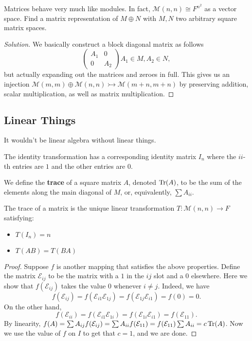 \begin{prb}
Matrices behave very much like modules. In fact, $\mathcal{M}(n, n)
\cong F^{n^2}$ as a vector space. Find a matrix representation of $M
\oplus N$ with $M, N$ two arbitrary square matrix spaces.
\end{prb}

\begin{proof}[Solution]
We basically construct a block diagonal matrix as follows
\[ \begin{pmatrix} A_1 & 0 \\ 0 & A_2 \end{pmatrix} A_1 \in M, A_2 \in
N, \]
but actually expanding out the matrices and zeroes in full. This gives
us an injection $\mathcal{M}(m, m) \oplus \mathcal{M}(n, n)
\rightarrowtail \mathcal{M}(m + n, m + n)$ by preserving addition,
scalar multiplication, as well as matrix multiplication.
\end{proof}

\subsection{Linear Things}
It wouldn't be linear algebra without linear things.
\begin{df}
The identity transformation has a corresponding identity matrix $I_n$
where the $ii$-th entries are $1$ and the other entries are $0$.
\end{df}

\begin{df}
We define the \textbf{trace} of a square matrix $A$, denoted $\operatorname{Tr}(A)$,
to be the sum of the elements along the main diagonal of $M$, or,
equivalently, $\sum A_{ii}$.
\end{df}

\begin{prop}
The trace of a matrix is the unique linear transformation $T :
\mathcal{M}(n, n) \rightarrow F$ satisfying:
\begin{itemize}
\item $T(I_n) = n$
\item $T(AB) = T(BA)$
\end{itemize}
\end{prop}

\begin{proof}
Suppose $f$ is another mapping that satisfies the above properties.
Define the matrix $\mathcal{E}_{ij}$ to be the matrix with a $1$ in the
$ij$ slot and a $0$ elsewhere. Here we show that $f(\mathcal{E}_{ij})$
takes the value $0$ whenever $i \neq j$. Indeed, we have
\[ f(\mathcal{E}_{ij}) = f(\mathcal{E}_{i1} \mathcal{E}_{1j}) =
f(\mathcal{E}_{1j} \mathcal{E}_{i1}) = f(0) = 0. \]
On the other hand,
\[ f(\mathcal{E}_{ii}) = f(\mathcal{E}_{i1} \mathcal{E}_{1i}) =
f(\mathcal{E}_{1i} \mathcal{E}_{i1}) = f(\mathcal{E}_{11}). \]
By linearity, $f(A) = \sum A_{ij} f(\mathcal{E}_{ij}) = \sum A_{ii}
f(\mathcal{E}_{11}) = f(\mathcal{E}_{11}) \sum A_{ii} = c \operatorname{Tr}(A)$. Now
we use the value of $f$ on $I$ to get that $c = 1$, and we are done.
\end{proof}

